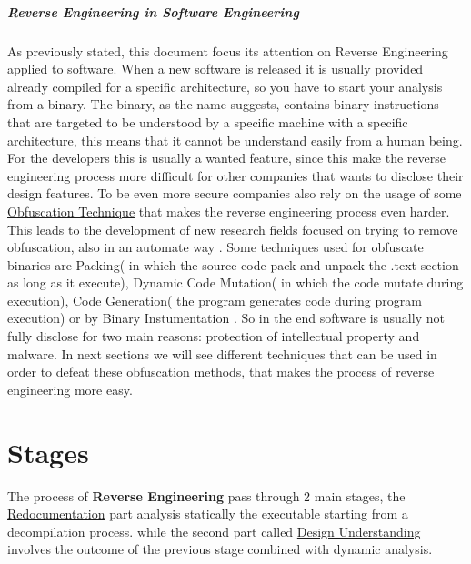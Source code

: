 \documentclass{article}
\begin{document}
\subparagraph{Reverse Engineering in Software Engineering}
As previously stated, this document focus its attention on Reverse Engineering applied to software. When a new software is released it is usually provided already compiled for a specific architecture, so you have to start your analysis from a binary.
The binary, as the name suggests, contains binary instructions that are targeted to be understood by a specific machine with a specific architecture, this means that it cannot be understand easily from a human being.
For the developers this is usually a wanted feature, since this make the reverse engineering process more difficult for other companies that wants to disclose their design features.
To be even more secure companies also rely on the usage of some \underline{Obfuscation Technique} that makes the reverse engineering process even harder. This leads to the development of new research fields focused on trying to remove obfuscation, also in an automate way \citep{1566145}.
Some techniques used for obfuscate binaries are Packing( in which the source code pack and unpack the .text section as long as it execute)\citep{SlidePackers}, Dynamic Code Mutation( in which the code mutate during execution), Code Generation( the program generates code during program execution) or by Binary Instumentation \cite{paperInstrumentation}.
So in the end software is usually not fully disclose for two main reasons: protection of intellectual property and malware. In next sections we will see different techniques that can be used in order to defeat these obfuscation methods, that makes the process of reverse engineering more easy.

\clearpage

\section{Stages} 
The process of \textbf{Reverse Engineering} pass through 2 main stages, the \underline{Redocumentation} part analysis statically the executable starting from a decompilation process.
while the second part called \underline{Design Understanding} involves the outcome of the previous stage combined with dynamic analysis.
\end{document}
